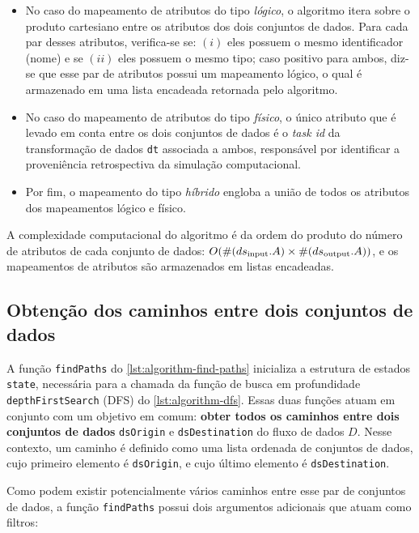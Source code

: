 \begin{itemize}
    \item No caso do mapeamento de atributos do tipo \emph{lógico}, o algoritmo itera sobre o produto cartesiano entre os atributos dos dois conjuntos de dados. Para cada par desses atributos, verifica-se se: \((i)\) eles possuem o mesmo identificador (nome) e se \((ii)\) eles possuem o mesmo tipo; caso positivo para ambos, diz-se que esse par de atributos possui um mapeamento lógico, o qual é armazenado em uma lista encadeada retornada pelo algoritmo.

    \item No caso do mapeamento de atributos do tipo \emph{físico}, o único atributo que é levado em conta entre os dois conjuntos de dados é o \textit{task id} da transformação de dados \texttt{dt} associada a ambos, responsável por identificar a proveniência retrospectiva da simulação computacional.

    \item Por fim, o mapeamento do tipo \emph{híbrido} engloba a união de todos os atributos dos mapeamentos lógico e físico.
\end{itemize}

A complexidade computacional do algoritmo é da ordem do produto do número de atributos de cada conjunto de dados: \(O(\#(ds_{\textup{input}}.A) \times \#(ds_{\textup{output}}.A))\), e os mapeamentos de atributos são armazenados em listas encadeadas.

\subsection{Obtenção dos caminhos entre dois conjuntos de dados}

A função \texttt{findPaths} do \autoref{lst:algorithm-find-paths} inicializa a estrutura de estados \texttt{state}, necessária para a chamada da função de busca em profundidade  \texttt{depthFirstSearch} (DFS) do \autoref{lst:algorithm-dfs}. Essas duas funções atuam em conjunto com um objetivo em comum: \textbf{obter todos os caminhos entre dois conjuntos de dados} \texttt{dsOrigin} e \texttt{dsDestination} do fluxo de dados \(D\).
Nesse contexto, um caminho é definido como uma lista ordenada de conjuntos de dados, cujo primeiro elemento é \texttt{dsOrigin}, e cujo último elemento é \texttt{dsDestination}.

Como podem existir potencialmente vários caminhos entre esse par de conjuntos de dados, a função \texttt{findPaths} possui dois argumentos adicionais que atuam como filtros:

